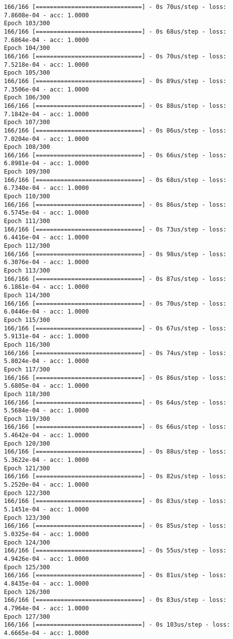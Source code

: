 \documentclass[11pt]{article}
\begin{document}
\begin{Verbatim}[commandchars=\\\{\}]
166/166 [==============================] - 0s 70us/step - loss: 7.8608e-04 - acc: 1.0000
Epoch 103/300
166/166 [==============================] - 0s 68us/step - loss: 7.6864e-04 - acc: 1.0000
Epoch 104/300
166/166 [==============================] - 0s 70us/step - loss: 7.5218e-04 - acc: 1.0000
Epoch 105/300
166/166 [==============================] - 0s 89us/step - loss: 7.3506e-04 - acc: 1.0000
Epoch 106/300
166/166 [==============================] - 0s 88us/step - loss: 7.1842e-04 - acc: 1.0000
Epoch 107/300
166/166 [==============================] - 0s 86us/step - loss: 7.0204e-04 - acc: 1.0000
Epoch 108/300
166/166 [==============================] - 0s 66us/step - loss: 6.8981e-04 - acc: 1.0000
Epoch 109/300
166/166 [==============================] - 0s 68us/step - loss: 6.7340e-04 - acc: 1.0000
Epoch 110/300
166/166 [==============================] - 0s 86us/step - loss: 6.5745e-04 - acc: 1.0000
Epoch 111/300
166/166 [==============================] - 0s 73us/step - loss: 6.4416e-04 - acc: 1.0000
Epoch 112/300
166/166 [==============================] - 0s 98us/step - loss: 6.3076e-04 - acc: 1.0000
Epoch 113/300
166/166 [==============================] - 0s 87us/step - loss: 6.1861e-04 - acc: 1.0000
Epoch 114/300
166/166 [==============================] - 0s 70us/step - loss: 6.0446e-04 - acc: 1.0000
Epoch 115/300
166/166 [==============================] - 0s 67us/step - loss: 5.9131e-04 - acc: 1.0000
Epoch 116/300
166/166 [==============================] - 0s 74us/step - loss: 5.8024e-04 - acc: 1.0000
Epoch 117/300
166/166 [==============================] - 0s 86us/step - loss: 5.6805e-04 - acc: 1.0000
Epoch 118/300
166/166 [==============================] - 0s 64us/step - loss: 5.5684e-04 - acc: 1.0000
Epoch 119/300
166/166 [==============================] - 0s 66us/step - loss: 5.4642e-04 - acc: 1.0000
Epoch 120/300
166/166 [==============================] - 0s 88us/step - loss: 5.3622e-04 - acc: 1.0000
Epoch 121/300
166/166 [==============================] - 0s 82us/step - loss: 5.2520e-04 - acc: 1.0000
Epoch 122/300
166/166 [==============================] - 0s 83us/step - loss: 5.1451e-04 - acc: 1.0000
Epoch 123/300
166/166 [==============================] - 0s 85us/step - loss: 5.0325e-04 - acc: 1.0000
Epoch 124/300
166/166 [==============================] - 0s 55us/step - loss: 4.9426e-04 - acc: 1.0000
Epoch 125/300
166/166 [==============================] - 0s 81us/step - loss: 4.8435e-04 - acc: 1.0000
Epoch 126/300
166/166 [==============================] - 0s 83us/step - loss: 4.7964e-04 - acc: 1.0000
Epoch 127/300
166/166 [==============================] - 0s 103us/step - loss: 4.6665e-04 - acc: 1.0000

\end{Verbatim}
\end{document}
